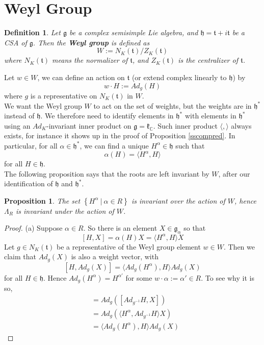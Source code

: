 \documentclass[11pt]{book}
\newtheorem{proposition}[theorem]{Proposition}
\newtheorem{definition}[theorem]{Definition}
\newcommand{\bb}[1]{\mathbb{#1}}
\newcommand{\mf}[1]{\mathfrak{#1}}
\begin{document}
\section{Weyl Group}
\begin{definition}
Let $\mf{g}$ be a complex semisimple Lie algebra, and $\mf{h} = \mf{t} + i\mf{t}$ be a CSA of $\mf{g}$. Then the \textbf{Weyl group} is defined as
$$W := N_K(\mf{t})/Z_K(\mf{t})$$
where $N_K(\mf{t})$ means the normalizer of $\mf{t}$, and $Z_K(\mf{t})$ is the centralizer of $\mf{t}$.
\end{definition}
Let $w \in W$, we can define an action on $\mf{t}$ (or extend complex linearly to $\mf{h}$) by
$$w \cdot H := Ad_g(H)$$
where $g$ is a representative on $N_K(\mf{t})$ in $W$.\\

We want the Weyl group $W$ to act on the set of weights, but the weights are in $\mf{h}^*$ instead of $\mf{h}$. We therefore need to identify elements in $\mf{h}^*$ with elements in $\mf{h}^*$ using an $Ad_K$-invariant inner product on $\mf{g} = \mf{k}_{\bb{C}}$. Such inner product $\langle, \rangle$ always exists, for instance it shows up in the proof of Proposition \ref{sscompred}. In particular, for all $\alpha \in \mf{h}^*$, we can find a unique $H^{\alpha} \in \mf{h}$ such that
$$\alpha(H) = \langle H^{\alpha},H\rangle$$
for all $H \in \mf{h}$.\\
The following proposition says that the roots are left invariant by $W$, after our identification of $\mf{h}$ and $\mf{h}^*$.
\begin{proposition}
The set $\left\{ H^{\alpha}\ \Big|\ \alpha \in R\right\}$ is invariant over the action of $W$, hence $\Lambda_R$ is invariant under the action of $W$.
\end{proposition}
\begin{proof}
(a) Suppose $\alpha \in R$. So there is an element $X \in \mf{g}_{\alpha}$ so that
$$[H,X] = \alpha(H)X = \langle H^{\alpha}, H\rangle X$$
Let $g \in N_K(\mf{t})$ be a representative of the Weyl group element $w \in W$. Then we claim that $Ad_g(X)$ is also a weight vector, with
$$[H, Ad_g(X)] = \langle Ad_g(H^{\alpha}), H \rangle Ad_g(X)$$
for all $H \in \mf{h}$. Hence $Ad_g(H^{\alpha}) = H^{\alpha'}$ for some $w\cdot \alpha := \alpha' \in R$. To see why it is so,
\begin{align*}
[H,Ad_g(X)] &= Ad_g([Ad_{g^{-1}}H, X])\\
&=Ad_g(\langle H^{\alpha}, Ad_{g^{-1}}H \rangle X)\\
&=\langle Ad_g(H^{\alpha}), H \rangle Ad_g(X)
\end{align*}
\end{proof}
\end{document}

